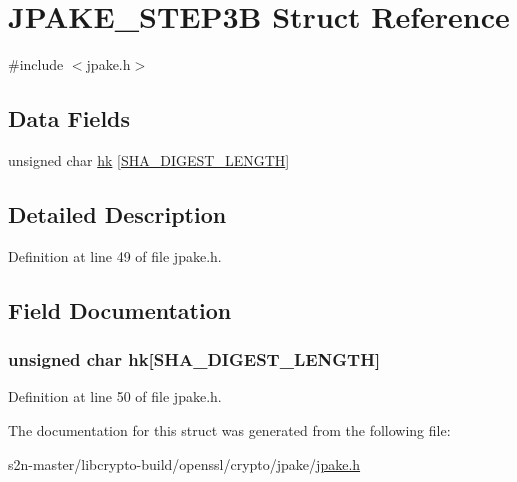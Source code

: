 \hypertarget{struct_j_p_a_k_e___s_t_e_p3_b}{}\section{J\+P\+A\+K\+E\+\_\+\+S\+T\+E\+P3B Struct Reference}
\label{struct_j_p_a_k_e___s_t_e_p3_b}


{\ttfamily \#include $<$jpake.\+h$>$}

\subsection*{Data Fields}
\begin{DoxyCompactItemize}
\item 
unsigned char \hyperlink{struct_j_p_a_k_e___s_t_e_p3_b_ab36666e6c70b972b10a7a738e27c91ca}{hk} \mbox{[}\hyperlink{include_2openssl_2sha_8h_a1a715db7b4403fe6c165e49a32f5fe3d}{S\+H\+A\+\_\+\+D\+I\+G\+E\+S\+T\+\_\+\+L\+E\+N\+G\+TH}\mbox{]}
\end{DoxyCompactItemize}


\subsection{Detailed Description}


Definition at line 49 of file jpake.\+h.



\subsection{Field Documentation}
\subsubsection[{\texorpdfstring{hk}{hk}}]{\setlength{\rightskip}{0pt plus 5cm}unsigned char hk\mbox{[}{\bf S\+H\+A\+\_\+\+D\+I\+G\+E\+S\+T\+\_\+\+L\+E\+N\+G\+TH}\mbox{]}}\hypertarget{struct_j_p_a_k_e___s_t_e_p3_b_ab36666e6c70b972b10a7a738e27c91ca}{}\label{struct_j_p_a_k_e___s_t_e_p3_b_ab36666e6c70b972b10a7a738e27c91ca}


Definition at line 50 of file jpake.\+h.



The documentation for this struct was generated from the following file\+:\begin{DoxyCompactItemize}
\item 
s2n-\/master/libcrypto-\/build/openssl/crypto/jpake/\hyperlink{jpake_8h}{jpake.\+h}\end{DoxyCompactItemize}
